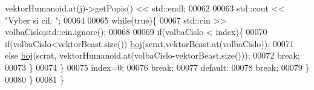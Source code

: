 \begin{DoxyCode}
      vektorHumanoid.at(j)->getPopis() << std::endl;
00062 
00063                     std::cout << \textcolor{stringliteral}{"Vyber si cil: "};
00064 
00065                     \textcolor{keywordflow}{while}(\textcolor{keyword}{true})\{
00067                         std::cin >> volbaCislo;std::cin.ignore();
00068 
00069                         \textcolor{keywordflow}{if}(volbaCislo < index)\{
00070                             \textcolor{keywordflow}{if}(volbaCislo<vektorBeast.size()) \hyperlink{namespaceIceAge_a2c6b97286bcd54e3ecf2fdc335460e90}{boj}(scrat,vektorBeast.at(volbaCislo));
00071                             \textcolor{keywordflow}{else} \hyperlink{namespaceIceAge_a2c6b97286bcd54e3ecf2fdc335460e90}{boj}(scrat, vektorHumanoid.at(volbaCislo-vektorBeast.size()));
00072                             \textcolor{keywordflow}{break};
00073                         \}
00074                     \}
00075                     index=0;
00076                     \textcolor{keywordflow}{break};
00077                 \textcolor{keywordflow}{default}:
00078                     \textcolor{keywordflow}{break};
00079             \}
00080         \}
00081 \}
\end{DoxyCode}
